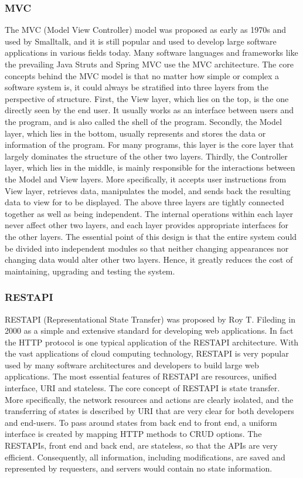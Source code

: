 \documentclass[letterpaper,10pt]{article}
\begin{document}
		\subsubsection{MVC}
        The MVC (Model View Controller) model was proposed as early as 1970s and used by Smalltalk, and it is still popular and used to develop large software applications in various fields today. Many software languages and frameworks like the prevailing Java Struts and Spring MVC use the MVC architecture. The core concepts behind the MVC model is that no matter how simple or complex a software system is, it could always be stratified into three layers from the perspective of structure. First, the View layer, which lies on the top, is the one directly seen by the end user. It usually works as an interface between users and the program, and is also called the shell of the program. Secondly, the Model layer, which lies in the bottom, usually represents and stores the data or information of the program. For many programs, this layer is the core layer that largely dominates the structure of the other two layers. Thirdly, the Controller layer, which lies in the middle, is mainly responsible for the interactions between the Model and View layers. More specifically, it accepts user instructions from View layer, retrieves data, manipulates the model, and sends back the resulting data to view for to be displayed. The above three layers are tightly connected together as well as being independent. The internal operations within each layer never affect other two layers, and each layer provides appropriate interfaces for the other layers. The essential point of this design is that the entire system could be divided into independent modules so that neither changing appearances nor changing data would alter other two layers. Hence, it greatly reduces the cost of maintaining, upgrading and testing the system.

		\subsubsection{RESTAPI}
    RESTAPI (Representational State Transfer) was proposed by Roy T. Fileding in 2000 as a simple and extensive standard for developing web applications. In fact the HTTP protocol is one typical application of the RESTAPI architecture. With the vast applications of cloud computing technology, RESTAPI is very popular used by many software architectures and developers to build large web applications. The most essential features of RESTAPI are resources, unified interface, URI and stateless.
	The core concept of RESTAPI is state transfer. More specifically, the network resources and actions are clearly isolated, and the transferring of states is described by URI that are very clear for both developers and end-users. To pass around states from back end to front end, a uniform interface is created by mapping HTTP methods to CRUD options. The RESTAPIs, front end and back end, are stateless, so that the APIs are very efficient. Consequently, all information, including modifications, are saved and represented by requesters, and servers would contain no state information.
\end{document}
